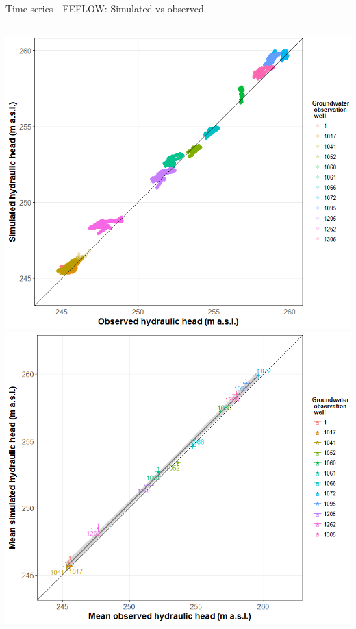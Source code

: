 \documentclass[8pt,ignorenonframetext,]{beamer}
\newcommand{\columnsbegin}{\begin{columns}}
\newcommand{\columnsend}{\end{columns}}
\begin{document}
\begin{frame}{Time series - FEFLOW: Simulated vs observed}

\columnsbegin
{}
\includegraphics{imgPres/time_series_head_analysis02.png}
\includegraphics{imgPres/time_series_head_analysis03.png} \columnsend

\end{frame}
\end{document}
